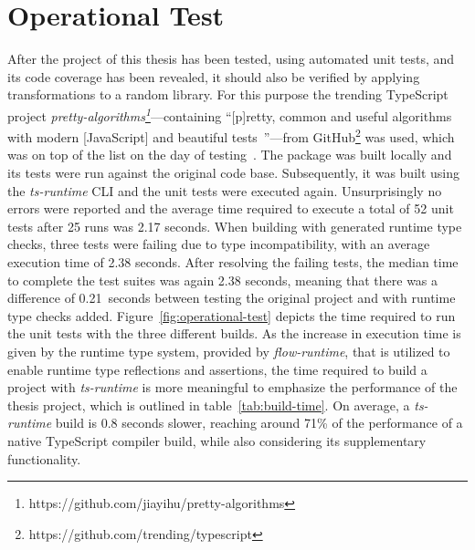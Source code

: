 
\section{Operational Test}
\label{sec:operational-test}

After the project of this thesis has been tested, using automated unit tests, and its code coverage has been revealed, it should also be verified by applying transformations to a random library. For this purpose the trending TypeScript project \emph{pretty-algorithms\footnote{https://github.com/jiayihu/pretty-algorithms}}---containing ``[p]retty, common and useful algorithms with modern [JavaScript] and beautiful tests~\cite{Evaluation:pretty-algorithms}''---from GitHub\footnote{https://github.com/trending/typescript} was used, which was on top of the list on the day of testing~\cite{GitHub:Trending:Archive}. The package was built locally and its tests were run against the original code base. Subsequently, it was built using the \emph{ts-runtime} CLI and the unit tests were executed again. Unsurprisingly no errors were reported and the average time required to execute a total of 52 unit tests after 25 runs was 2.17 seconds. When building with generated runtime type checks, three tests were failing due to type incompatibility, with an average execution time of 2.38 seconds. After resolving the failing tests, the median time to complete the test suites was again 2.38 seconds, meaning that there was a difference of 0.21 seconds between testing the original project and with runtime type checks added. Figure~\ref{fig:operational-test} depicts the time required to run the unit tests with the three different builds. As the increase in execution time is given by the runtime type system, provided by \emph{flow-runtime}, that is utilized to enable runtime type reflections and assertions, the time required to build a project with \emph{ts-runtime} is more meaningful to emphasize the performance of the thesis project, which is outlined in table~\ref{tab:build-time}. On average, a \emph{ts-runtime} build is 0.8 seconds slower, reaching around 71\% of the performance of a native TypeScript compiler build, while also considering its supplementary functionality. 
